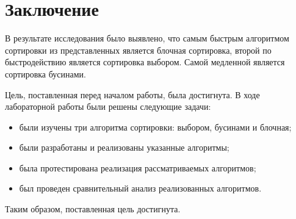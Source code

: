\chapter*{Заключение}


В результате исследования было выявлено, что самым быстрым алгоритмом сортировки из представленных является блочная сортировка, второй по быстродействию является сортировка выбором. Самой медленной является сортировка бусинами.

Цель, поставленная перед началом работы, была достигнута. В ходе лабораторной работы были решены следующие задачи:

\begin{itemize}
	\item были изучены три алгоритма сортировки: выбором, бусинами и блочная;
	\item были разработаны и реализованы указанные алгоритмы;
	\item была протестирована реализация рассматриваемых алгоритмов;
	\item был проведен сравнительный анализ реализованных алгоритмов.
\end{itemize}

Таким образом, поставленная цель достигнута.
